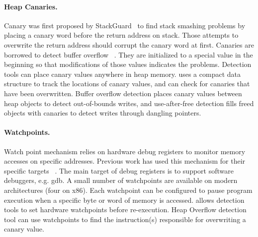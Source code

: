 \paragraph{Heap Canaries.}
Canary was first proposed by StackGuard~\cite{StackGuard} to find stack smashing problems by placing a canary word before the return address on stack. Those attempts to overwrite the return address should corrupt the canary word at first. Canaries are borrowed to detect buffer overflow ~\cite{overflow:purify}. They are initialized to a special value in the beginning so that modifications of those values
indicates the problems. Detection tools can place canary values anywhere in heap memory. \doubletake{} uses a compact data structure to track the locations of canary values, and can check for canaries that have been overwritten. Buffer overflow detection places canary values between heap objects to detect out-of-bounds writes, and use-after-free detection fills freed objects with canaries to detect writes through dangling pointers.

\paragraph{Watchpoints.}
Watch point mechanism relies on hardware debug registers to monitor memory accesses on specific addresses. Previous work has used this mechanism for their specific targets ~\cite{fastboundschecking, Kivati}. The main target of debug registers is to support software debuggers, e.g. gdb. A small number of watchpoints are available on modern architectures (four on x86). Each watchpoint can be configured to pause program execution when a specific byte or word of memory is accessed. \doubletake{} allows detection tools to set hardware watchpoints before re-execution. Heap Overflow detection tool can use watchpoints to find the instruction(s) responsible for overwriting a canary value.


